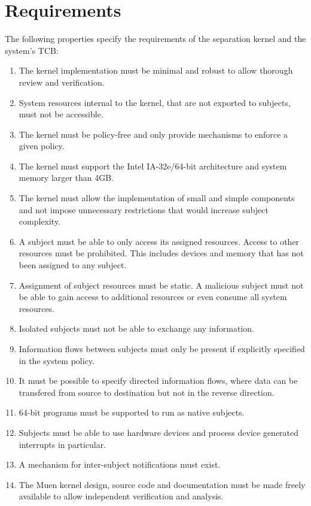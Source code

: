 \section{Requirements}\label{sec:requirements}

The following properties specify the requirements of the separation kernel and
the system's TCB:
\begin{enumerate}
	\item The kernel implementation must be minimal and robust to allow thorough
		review and verification.
	\item System resources internal to the kernel, that are not exported to
		subjects, must not be accessible.
	\item The kernel must be policy-free and only provide mechanisms to enforce
		a given policy.
	\item The kernel must support the Intel IA-32e/64-bit architecture and
		system memory larger than 4GB.
	\item The kernel must allow the implementation of small and simple
		components and not impose unnecessary restrictions that would increase
		subject complexity.
	\item A subject must be able to only access its assigned resources. Access
		to other resources must be prohibited. This includes devices and memory
		that has not been assigned to any subject.
	\item Assignment of subject resources must be static. A malicious subject
		must not be able to gain access to additional resources or even consume
		all system resources.
	\item Isolated subjects must not be able to exchange any information.
	\item Information flows between subjects must only be present if explicitly
		specified in the system policy.
	\item It must be possible to specify directed information flows, where data
		can be transfered from source to destination but not in the reverse
		direction.
	\item 64-bit programs must be supported to run as native subjects.
	\item Subjects must be able to use hardware devices and process device
		generated interrupts in particular.
	\item A mechanism for inter-subject notifications must exist.
	\item The Muen kernel design, source code and documentation must be made
		freely available to allow independent verification and analysis.
\end{enumerate}
